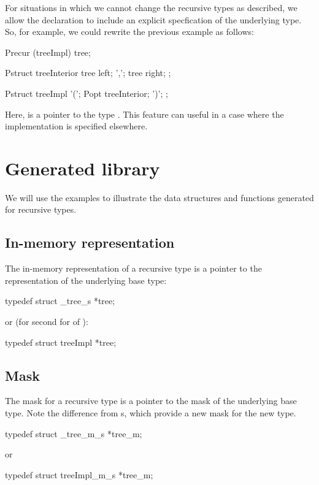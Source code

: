 For situations in which we cannot change the recursive types as
described, we allow the  declaration to include an explicit
specfication of the underlying type. So, for example, we could rewrite
the previous example as follows:

\begin{code}
Precur (treeImpl) tree;

Pstruct treeInterior {
  tree left;
  ',';
  tree right;
};

Pstruct treeImpl{
  '(';
  Popt treeInterior;
  ')';
};
\end{code}

Here,  is a pointer to the type . This feature
can useful in a case where the implementation is specified elsewhere.

\section{Generated library}
We will use the  examples to illustrate the data structures
and functions generated for recursive types.

\subsection{In-memory representation}
\label{sec:recur-rep}
The in-memory representation of a recursive type is a pointer to the
representation of the underlying base type:

\begin{code}
typedef struct _tree_s    *tree;
\end{code}
or (for second for of \Precur{}):
\begin{code}
typedef struct treeImpl    *tree;
\end{code}

\subsection{Mask}
\label{sec:recur-masks}
The mask for a recursive type is a pointer to the
mask of the underlying base type. Note the difference from
\ptypedef{}s, which provide a new mask for the new type.

\begin{code}
typedef struct _tree_m_s  *tree_m;
\end{code}
or
\begin{code}
typedef struct treeImpl_m_s  *tree_m;
\end{code}

